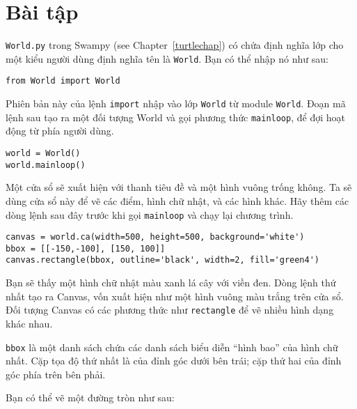 \documentclass[11pt]{book}
\begin{document}
\section{Bài tập}

\begin{ex}
\label{canvas}


{\tt World.py} trong Swampy (see Chapter~\ref{turtlechap})
có chứa định nghĩa lớp cho một kiểu người dùng định nghĩa tên là
{\tt World}.  Bạn có thể nhập nó như sau:

\beforeverb
\begin{verbatim}
from World import World
\end{verbatim}
\afterverb

Phiên bản này của lệnh {\tt import} nhập vào lớp {\tt World}
từ module {\tt World}.
Đoạn mã lệnh sau tạo ra một đối tượng World và gọi
phương thức {\tt mainloop}, để đợi hoạt động từ phía người dùng.

\beforeverb
\begin{verbatim}
world = World()
world.mainloop()
\end{verbatim}
\afterverb

Một cửa sổ sẽ xuất hiện với thanh tiêu đề và một hình vuông trống không.
Ta sẽ dùng cửa sổ này để vẽ các điểm, hình chữ nhật, và các hình khác.
Hãy thêm các dòng lệnh sau đây trước khi gọi 
\verb"mainloop" và chạy lại chương trình.


\beforeverb
\begin{verbatim}
canvas = world.ca(width=500, height=500, background='white')
bbox = [[-150,-100], [150, 100]]
canvas.rectangle(bbox, outline='black', width=2, fill='green4')
\end{verbatim}
\afterverb

Bạn sẽ thấy một hình chữ nhật màu xanh lá cây với viền đen.
Dòng lệnh thứ nhất tạo ra Canvas, vốn xuất hiện như một hình vuông
màu trắng trên cửa sổ. Đối tượng Canvas có các phương thức như
{\tt rectangle} để vẽ nhiều hình dạng khác nhau.


{\tt bbox} là một danh sách chứa các danh sách biểu diễn ``hình bao''
của hình chữ nhất. Cặp tọa độ thứ nhất là của đỉnh góc dưới  bên trái;
cặp thứ hai của đỉnh góc phía trên bên phải.

Bạn có thể vẽ một đường tròn như sau:


\end{ex}
\end{document}
